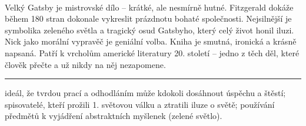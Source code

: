 \documentclass[FGBook.tex]{subfiles}
\begin{document}
\vspace*{2em}\\
\noindent Velký Gatsby je mistrovské dílo – krátké, ale nesmírně hutné. Fitzgerald dokáže během 180 stran dokonale vykreslit prázdnotu bohaté společnosti. Nejsilnější je symbolika zeleného světla a tragický osud Gatsbyho, který celý život honil iluzi. Nick jako morální vypravěč je geniální volba. Kniha je smutná, ironická a krásně napsaná. Patří k vrcholům americké literatury 20. století – jedno z těch děl, které člověk přečte a už nikdy na něj nezapomene.

\vfill

\noindent\begin{minipage}{\textwidth}
    {\textcolor{\wpagecolor}{\rule{\linewidth}{0.4pt}}
    \footnotesize
     ideál, že tvrdou prací a odhodláním může kdokoli dosáhnout úspěchu a štěstí; 
     spisovatelé, kteří prožili 1. světovou válku a ztratili iluze o světě; 
     používání předmětů k vyjádření abstraktních myšlenek (zelené světlo).
    }
\end{minipage}

\newpage
\end{document}
